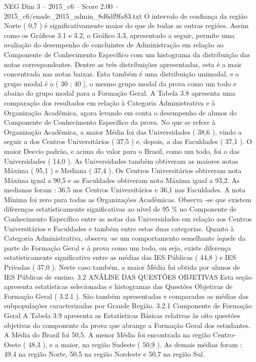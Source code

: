 \begin{textsample}{NEG Dim 3 – 2015\_c6 – Score 2.00 – 2015\_c6/enade\_2015\_admin\_8d6df9fa83.txt}
O intervalo de confiança da região Norte ( 0,7 ) é significativamente maior do que de todas as outras regiões.
Assim como os Gráficos 3.1 e 3.2, o Gráfico 3.3, apresentado a seguir, permite uma avaliação do desempenho de concluintes de Administração em relação ao Componente de Conhecimento Específico com um histograma da distribuição das notas correspondentes.
Dentre as três distribuições apresentadas, esta é a mais concentrada nas notas baixas.
Esta também é uma distribuição unimodal, e o grupo modal é o ( 30 ; 40 ], o mesmo grupo modal da prova como um todo e abaixo do grupo modal para a Formação Geral.
A Tabela 3.8 apresenta uma comparação dos resultados em relação à Categoria Administrativa e à Organização Acadêmica, agora levando em conta o desempenho de alunos do Componente de Conhecimento Específico da prova.
No que se refere à Organização Acadêmica, a maior Média foi das Universidades ( 38,6 ), vindo a seguir a dos Centros Universitários ( 37,5 ) e, depois, a das Faculdades ( 37,1 ).
O maior Desvio padrão, e acima do valor para o Brasil, como um todo, foi o das Universidades ( 14,0 ).
As Universidades também obtiveram as maiores notas Máxima ( 95,1 ) e Mediana ( 37,4 ).
Os Centros Universitários obtiveram nota Máxima igual a 90,5 e as Faculdades obtiveram nota Máxima igual a 93,2.
As medianas foram : 36,5 nos Centros Universitários e 36,1 nas Faculdades.
A nota Mínima foi zero para todas as Organizações Acadêmicas.
Observa -se que existem diferenças estatisticamente significativas ao nível de 95 \% no Componente de Conhecimento Específico entre as notas das Universidades em relação aos Centros Universitários e Faculdades e também entre estas duas categorias.
Quanto à Categoria Administrativa, observa -se um comportamento semelhante àquele da parte de Formação Geral e à prova como um todo, ou seja, existe diferença estatisticamente significativa entre as médias das IES Públicas ( 44,8 ) e IES Privadas ( 37,0 ).
Neste caso também, a maior Média foi obtida por alunos de IES Públicas de ensino. 3.2 ANÁLISE DAS QUESTÕES OBJETIVAS Esta seção apresenta estatísticas selecionadas e histogramas das Questões Objetivas de Formação Geral ( 3.2.1 ).
São também apresentadas e comparadas as médias das subpopulações caracterizadas por Grande Região. 3.2.1 Componente de Formação Geral A Tabela 3.9 apresenta as Estatísticas Básicas relativas às oito questões objetivas do componente da prova que abrange a Formação Geral dos estudantes.
A Média do Brasil foi 50,5.
A menor Média foi encontrada na região Centro-Oeste ( 48,3 ), e a maior, na região Sudeste ( 50,9 ).
As demais médias foram : 49,4 na região Norte, 50,5 na região Nordeste e 50,7 na região Sul.

\end{textsample}
